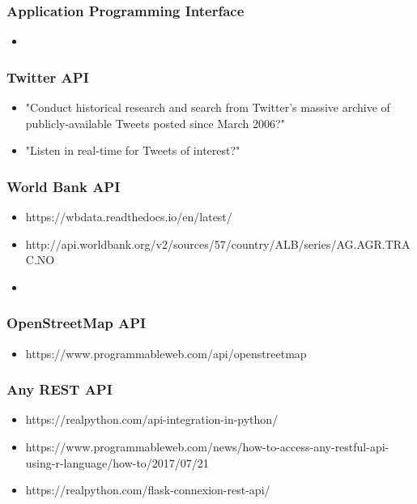 
\begin{frame}
    \frametitle{Application Programming Interface}
    \begin{itemize}
        \item
    \end{itemize}
\end{frame}

\begin{frame}
    \frametitle{Twitter API}
    \begin{itemize}
        \item "Conduct historical research and search from Twitter's massive
        archive of publicly-available Tweets posted since March 2006?"
        \item "Listen in real-time for Tweets of interest?"
    \end{itemize}
\end{frame}

\begin{frame}
    \frametitle{World Bank API}
    \begin{itemize}
        \item https://wbdata.readthedocs.io/en/latest/
        \item http://api.worldbank.org/v2/sources/57/country/ALB/series/AG.AGR.TRAC.NO
        \item
    \end{itemize}
\end{frame}

\begin{frame}
    \frametitle{OpenStreetMap API}
    \begin{itemize}
        \item https://www.programmableweb.com/api/openstreetmap
    \end{itemize}
\end{frame}

\begin{frame}
    \frametitle{Any REST API}
    \begin{itemize}
        \item https://realpython.com/api-integration-in-python/
        \item https://www.programmableweb.com/news/how-to-access-any-restful-api-using-r-language/how-to/2017/07/21
        \item https://realpython.com/flask-connexion-rest-api/
    \end{itemize}

\end{frame}
